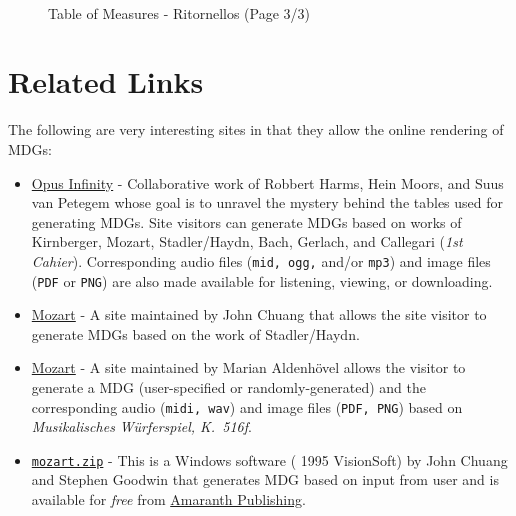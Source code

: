 \documentclass[a4paper,x11names,svgnames,10pt]{article}
\begin{document}
{\newpage
${}_{}$\\
\vspace{0.10in}
\begin{figure}[H]
	\centering
	\def\svgwidth{0.975\columnwidth}
	
	\caption{Table of Measures - Ritornellos (Page 3/3)}
	\label{fig:meas16}
\end{figure}


\section{Related Links}
The following are very interesting sites in that they allow the online rendering of MDGs:
\begin{itemize}
	\item \href{https://opus-infinity.org}{Opus Infinity} - Collaborative work of Robbert Harms, Hein Moors, and Suus van Petegem whose goal is to unravel the mystery behind the tables used for generating MDGs.  Site visitors can generate MDGs based on works of Kirnberger, Mozart, Stadler/Haydn, Bach, Gerlach, and Callegari ({\it 1st Cahier}).  Corresponding audio files ({\tt mid, ogg,} and/or {\tt mp3}) and image files ({\tt PDF} or {\tt PNG}) are also made available for listening, viewing, or downloading.
	
	\item  \href{http://sunsite.univie.ac.at/Mozart/dice/}{Mozart} - A site maintained by John Chuang that allows the site visitor to generate MDGs based on the work of Stadler/Haydn.
	
	\item  \href{https://marian-aldenhoevel.de/mozart/}{Mozart} - A site maintained by Marian Aldenh\"{o}vel allows the visitor to generate a MDG (user-specified or randomly-generated) and the corresponding audio ({\tt midi, wav}) and image files ({\tt PDF, PNG}) based on {\em Musikalisches W\"{u}rferspiel, K.\ 516f}.
	
	\item \href{https://www.amaranthpublishing.com/mozart.zip}{\tt mozart.zip} -  This is a Windows software ({\small\textcopyright} 1995 VisionSoft) by John Chuang and Stephen Goodwin that generates MDG based on input from user and is available for {\it free} from  \href{http://www.amaranthpublishing.com/MozartDiceGame.htm}{Amaranth Publishing}.  
	

\end{itemize}}
\end{document}
